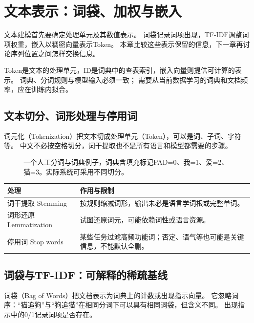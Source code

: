 \chapter{文本表示：词袋、加权与嵌入}
\label{ch:text}

文本建模首先要确定处理单元及其数值表示。
词袋记录词项出现，TF-IDF调整词项权重，嵌入以稠密向量表示Token。
本章比较这些表示保留的信息，下一章再讨论序列位置之间怎样交换信息。

\begin{keyidea}
Token是文本的处理单元，ID是词典中的查表索引，嵌入向量则提供可计算的表示。
词典、分词规则与模型输入必须一致；
需要从当前数据学习的词典和文档频率，应在训练内拟合。
\end{keyidea}

\section{文本切分、词形处理与停用词}
\label{sec:text-tokens}
词元化（Tokenization）把文本切成处理单元（Token），可以是词、子词、字符等。
中文不必按空格切分，词干提取也不是所有语言和模型都需要的步骤。

\begin{figure}[htbp]
\centering
\caption{一个人工分词与词典例子，词典含填充标记PAD=0、我=1、爱=2、猫=3。实际系统可采用不同切分。}
\par\smallskip
{}
\end{figure}

\begin{center}
\begin{tabularx}{\textwidth}{P{35mm}Y}
\toprule
处理 & 作用与限制\\
\midrule
词干提取 Stemming & 按规则缩减词形，输出未必是语言学词根或完整单词。\\
词形还原 Lemmatization & 试图还原词元，可能依赖词性或语言资源。\\
停用词 Stop words & 某些任务过滤高频功能词；否定、语气等也可能是关键信息，不能默认全删。\\
\bottomrule
\end{tabularx}
\end{center}


\section{词袋与TF-IDF：可解释的稀疏基线}
\label{sec:text-tfidf}
词袋（Bag of Words）把文档表示为词典上的计数或出现指示向量。
它忽略词序：“猫追狗”与“狗追猫”在相同分词下可以具有相同词袋，但含义不同。
出现指示中的0/1记录词项是否存在。

